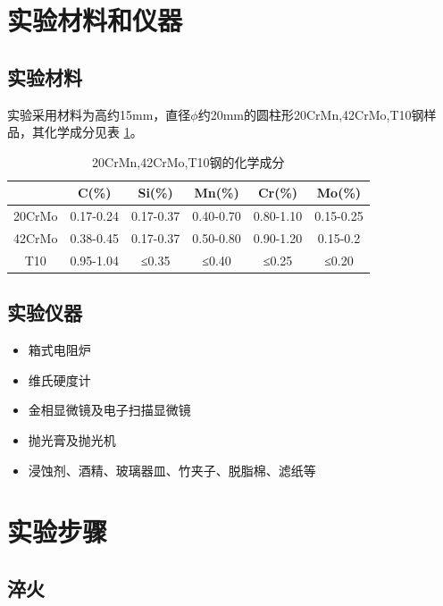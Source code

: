 \documentclass[12pt]{ctexart}
\begin{document}
\section{实验材料和仪器}
\subsection{实验材料}
实验采用材料为高约15mm，直径$\phi$约20mm的圆柱形20CrMn,42CrMo,T10钢样品，其化学成分见表 \ref{huaxuechengfen}。

\begin{table}[ht!]
\centering
\caption{20CrMn,42CrMo,T10钢的化学成分}
\label{huaxuechengfen}
\begin{tabular}{cccccc}
\toprule
&C(\%)&Si(\%)&Mn(\%)&Cr(\%)&Mo(\%)\\
\midrule
20CrMo&0.17-0.24&0.17-0.37&0.40-0.70&0.80-1.10&0.15-0.25\\
42CrMo&0.38-0.45&0.17-0.37&0.50-0.80&0.90-1.20&0.15-0.2\\
T10&0.95-1.04&≤0.35&≤0.40&≤0.25&≤0.20\\
\bottomrule
\end{tabular}
\end{table}

\subsection{实验仪器}
\begin{itemize}
\item 箱式电阻炉
\item 维氏硬度计
\item 金相显微镜及电子扫描显微镜
\item 抛光膏及抛光机
\item 浸蚀剂、酒精、玻璃器皿、竹夹子、脱脂棉、滤纸等
\end{itemize}

\section{实验步骤}
\subsection{淬火}
\end{document}
